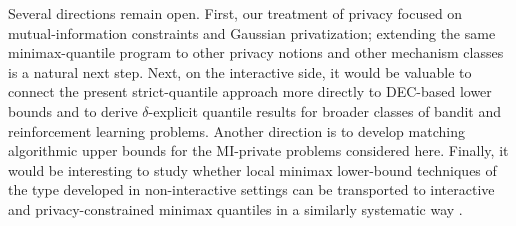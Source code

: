 \documentclass[journal]{IEEEtran}
\begin{document}
Several directions remain open. First, our treatment of privacy focused on mutual-information constraints and Gaussian privatization; extending the same minimax-quantile program to other privacy notions and other mechanism classes is a natural next step. Next, on the interactive side, it would be valuable to connect the present strict-quantile approach more directly to DEC-based lower bounds and to derive \(\delta\)-explicit quantile results for broader classes of bandit and reinforcement learning problems. Another direction is to develop matching algorithmic upper bounds for the MI-private problems considered here. Finally, it would be interesting to study whether local minimax lower-bound techniques of the type developed in non-interactive settings can be transported to interactive and privacy-constrained minimax quantiles in a similarly systematic way \cite[Theorem~8]{ma2024high}.
\IEEEpeerreviewmaketitle
 


\newpage


\newpage
\appendix
\end{document}
